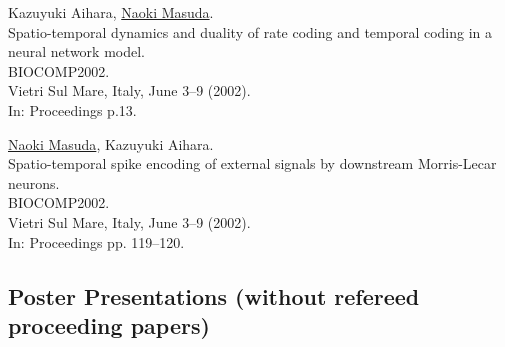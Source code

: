 \documentclass[11pt,letter]{article}
\begin{document}
\begin{etaremune}
\item Kazuyuki Aihara, \underline{Naoki Masuda}.\\
Spatio-temporal dynamics and duality of rate coding and temporal coding in a neural network model.\\
BIOCOMP2002.\\
Vietri Sul Mare, Italy, June 3--9 (2002).\\
In: Proceedings p.13.

\item \underline{Naoki Masuda}, Kazuyuki Aihara.\\
Spatio-temporal spike encoding of external signals by downstream Morris-Lecar neurons.\\
BIOCOMP2002.\\
Vietri Sul Mare, Italy, June 3--9 (2002).\\
In: Proceedings pp. 119--120.

\end{etaremune}

\subsection*{\bf \normalsize Poster Presentations (without refereed proceeding papers)}
\end{document}
